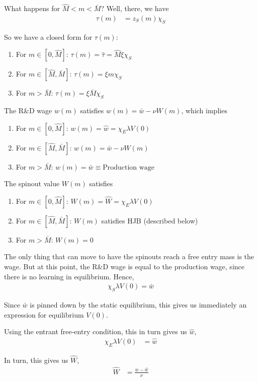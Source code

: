 \documentclass[12pt,english]{article}
\theoremstyle{remark}
\begin{document}
What happens for $\hat{M} < m < \bar{M}$? Well, there, we have 
\begin{align*}
	\tau(m) &= z_S(m) \chi_S 
\end{align*}

So we have a closed form for $\tau(m)$:
\begin{enumerate}
	\item For $m \in [0,\hat{M}]$: $\tau(m) = \hat{\tau} = \hat{M}  \xi \chi_S$ 
	\item For $m \in [\hat{M},\bar{M}]$: $\tau(m) = \xi m \chi_S$
	\item For $m > \bar{M}$: $\tau(m) = \xi \bar{M} \chi_S$
\end{enumerate}

The R\&D wage $w(m)$ satisfies $w(m) = \bar{w} - \nu W(m)$, which implies
\begin{enumerate}
	\item For $m \in [0,\hat{M}]$: $w(m) = \hat{w} = \chi_E \lambda V(0) $ 
	\item For $m \in [\hat{M},\bar{M}]$: $w(m) = \bar{w} - \nu W(m)$
	\item For $m > \bar{M}$: $w(m) = \bar{w} \equiv \textrm{Production wage}$
\end{enumerate}

The spinout value $W(m)$ satisfies
\begin{enumerate}
	\item For $m \in [0,\hat{M}]$: $W(m) = \hat{W} = \chi_E \lambda V(0) $ 
	\item For $m \in [\hat{M},\bar{M}]$: $W(m)$ satisfies HJB (described below)
	\item For $m > \bar{M}$: $W(m) = 0$ 	
\end{enumerate}

The only thing that can move to have the spinouts reach a free entry mass is the wage. But at this point, the R\&D wage is equal to the production wage, since there is no learning in equilibrium. Hence,
\begin{align*}
	\chi_S \lambda V(0) = \bar{w}
\end{align*}

Since $\bar{w}$ is pinned down by the static equilibrium, this gives us immediately an expression for equilibrium $V(0)$.

Using the entrant free-entry condition, this in turn gives us $\hat{w}$,
\begin{align*}
	\chi_E \lambda V(0) &= \hat{w} 
\end{align*}

In turn, this gives us $\hat{W}$, 
\begin{align*}
	\hat{W} &= \frac{\bar{w} - \hat{w}}{\nu}
\end{align*}
\end{document}
